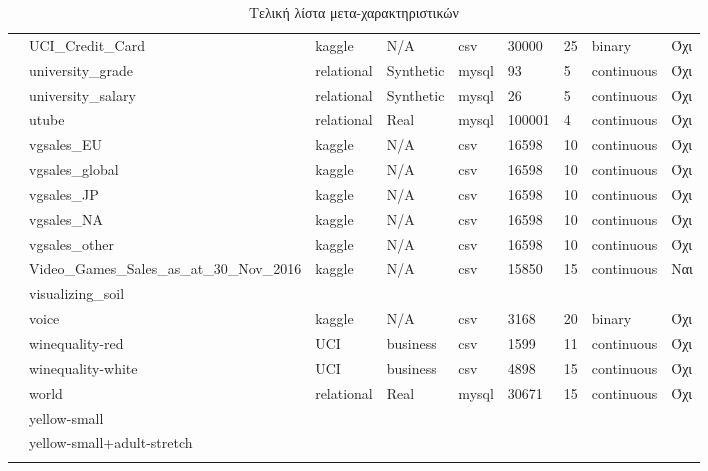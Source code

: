 \begin{longtable}{| p{} | p{}| p{} | p{} | p{} | p{} | p{} | p{} | p{} | }
 			\rownumber & UCI\_Credit\_Card & kaggle & N/A & csv & 30000 & 25 & binary & Όχι \\
 			\rownumber & university\_grade \citep{uni} & relational & Synthetic & mysql & 93 & 5  & continuous & Όχι \\
 			\rownumber & university\_salary \citep{uni} & relational & Synthetic & mysql & 26 & 5 & continuous & Όχι \\
 			\rownumber & utube \citep{utube} & relational & Real & mysql & 100001 & 4 & continuous & Όχι \\
 			\rownumber & vgsales\_EU \citep{vgsales} & kaggle & N/A & csv  & 16598 & 10 & continuous & Όχι\\
 			\rownumber & vgsales\_global \citep{vgsales} & kaggle & N/A & csv  & 16598 & 10 & continuous & Όχι \\
 			\rownumber & vgsales\_JP \citep{vgsales} & kaggle & N/A & csv  & 16598 & 10 & continuous & Όχι \\
 			\rownumber & vgsales\_NA \citep{vgsales} & kaggle & N/A & csv  & 16598 & 10 & continuous & Όχι \\
 			\rownumber & vgsales\_other \citep{vgsales} & kaggle & N/A & csv  & 16598 & 10 & continuous & Όχι \\
 			\rownumber & Video\_Games\_Sales\_as\_at\_30\_Nov\_2016 \citep{vgames} & kaggle & N/A & csv & 15850 & 15 & continuous & Ναι \\
 			\rownumber & visualizing\_soil & & & & & & & \\
 			\rownumber & voice \citep{Gender Recognition by Voice} & kaggle & N/A & csv & 3168 & 20 & binary & Όχι \\
 			\rownumber & winequality-red & UCI & business & csv & 1599 & 11 & continuous & Όχι \\
 			\rownumber & winequality-white & UCI & business & csv & 4898 & 15 & continuous & Όχι \\
 			\rownumber & world & relational & Real & mysql & 30671 & 15 & continuous & Όχι \\
 		 \rownumber & yellow-small & & & & & & & \\
 			\rownumber & yellow-small+adult-stretch & & & & & & & \\
			\hline   
			 	\caption{Τελική λίστα μετα-χαρακτηριστικών}\label{mfs}    	  

 \end{longtable}